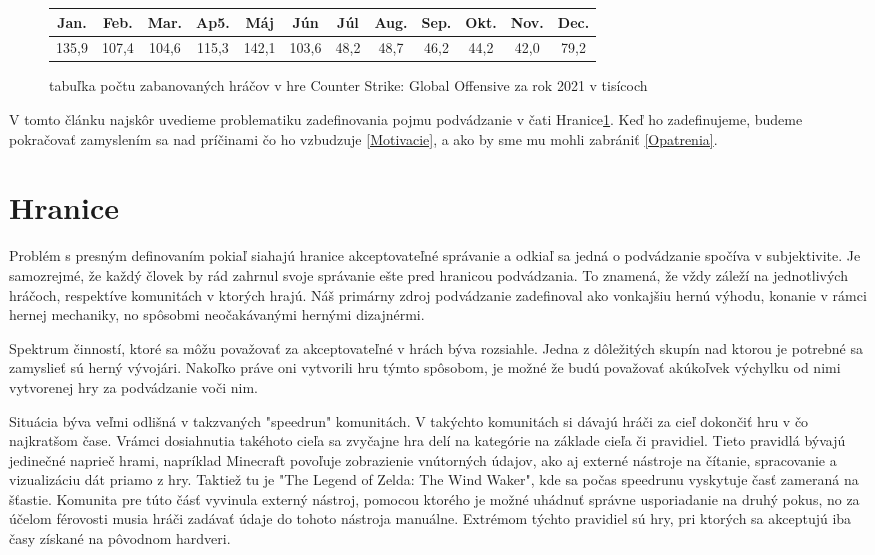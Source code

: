 \documentclass[10pt, oneside, slovak,a4paper]{article}
\begin{document}
\begin{figure}[h]
\caption{tabuľka počtu zabanovaných hráčov v hre Counter Strike: Global Offensive za rok 2021 v tisícoch}
\label{tabulka}
\begin{tabular}{ |c|c|c|c|c|c|c|c|c|c|c|c |}
\hline
Jan. & Feb. & Mar. & Ap5. & Máj & Jún & Júl & Aug. & Sep. & Okt. & Nov. & Dec. \\
\hline
135,9 & 107,4 & 104,6 & 115,3 & 142,1 & 103,6 & 48,2 & 48,7 & 46,2 & 44,2 & 42,0 & 79,2 \\
\hline
\end{tabular}
\end{figure}

V tomto článku najskôr uvedieme problematiku zadefinovania pojmu podvádzanie v čati Hranice\ref{Hranice}. Keď ho zadefinujeme, budeme pokračovať zamyslením sa nad príčinami čo ho vzbudzuje \ref{Motivacie}, a ako by sme mu mohli zabrániť \ref{Opatrenia}.
\section{Hranice}
\label{Hranice}

Problém s presným definovaním pokiaľ siahajú hranice akceptovateľné správanie a odkiaľ sa jedná o podvádzanie spočíva v subjektivite. Je samozrejmé, že každý človek by rád zahrnul svoje správanie ešte pred hranicou podvádzania. To znamená, že vždy záleží na jednotlivých hráčoch,  respektíve komunitách v ktorých hrajú. Náš primárny zdroj podvádzanie zadefinoval ako vonkajšiu hernú výhodu, konanie v rámci hernej mechaniky, no spôsobmi neočakávanými hernými dizajnérmi\cite{mood}.

Spektrum činností, ktoré sa môžu považovať za akceptovateľné v hrách býva rozsiahle. Jedna z dôležitých skupín nad ktorou je potrebné sa zamyslieť sú herný vývojári. Nakoľko práve oni vytvorili hru týmto spôsobom, je možné že budú považovať akúkoľvek výchylku od nimi vytvorenej hry za podvádzanie voči nim. 

Situácia býva veľmi odlišná v takzvaných "speedrun" komunitách. V takýchto komunitách si dávajú hráči za cieľ dokončiť hru v čo najkratšom čase. Vrámci dosiahnutia takéhoto cieľa sa zvyčajne hra delí na kategórie na základe cieľa či pravidiel. Tieto pravidlá bývajú jedinečné naprieč hrami, napríklad Minecraft povoľuje zobrazienie vnútorných údajov, ako aj externé nástroje na čítanie, spracovanie  a vizualizáciu dát priamo z hry. Taktiež tu je "The Legend of Zelda: The Wind Waker", kde sa počas speedrunu vyskytuje časť zameraná na šťastie. Komunita pre túto čásť vyvinula externý nástroj, pomocou ktorého je možné uhádnuť správne usporiadanie na druhý pokus, no za účelom férovosti musia hráči zadávať údaje do tohoto nástroja manuálne\cite{zelda}. Extrémom týchto pravidiel sú hry, pri ktorých sa akceptujú iba časy získané na pôvodnom hardveri.
\end{document}
